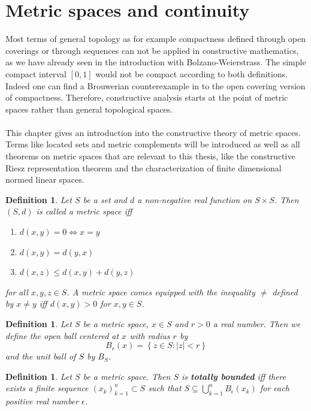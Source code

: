 \documentclass[11pt,a4paper,leqno]{report}
\newtheorem{definition}[theorem]{Definition}
\numberwithin{equation}{chapter}
\begin{document}
\section{Metric spaces and continuity}
Most terms of general topology as for example compactness defined through open coverings or through sequences can not be applied in constructive mathematics, as we have already seen in the introduction with Bolzano-Weierstrass. The simple compact interval $[0,1]$ would not be compact according to both definitions. Indeed one can find a Brouwerian counterexample in \cite{VAR} to the open covering version of compactness. Therefore, constructive analysis starts at the point of metric spaces rather than general topological spaces. \\
\\
This chapter gives an introduction into the constructive theory of metric spaces. Terms like located sets and metric complements will be introduced as well as all theorems on metric spaces that are relevant to this thesis, like the constructive Riesz representation theorem and the characterization of finite dimensional normed linear spaces.
\begin{definition} Let $S$ be a set and $d$ a non-negative real function on $S\times S$. Then $(S,d)$ is called a metric space iff
\begin{enumerate}
\item{$d(x,y)=0\Leftrightarrow x=y$}
\item{$d(x,y)=d(y,x)$}
\item{$d(x,z)\leq d(x,y)+d(y,z)$}
\end{enumerate}
for all $x,y,z\in S$. A metric space comes equipped with the inequality $\neq$ defined by $x\neq y$ iff $d(x,y)>0$ for $x,y\in S$.
\end{definition}
\begin{definition} Let $S$ be a metric space, $x\in S$ and $r>0$ a real number. Then we define the open ball centered at $x$ with radius $r$ by 
\begin{equation} B_r(x)=\left\{z\in S: |z|< r\right\}\end{equation}
and the unit ball of $S$ by $B_S$.
\end{definition}
\begin{definition} Let $S$ be a metric space. Then $S$ is \textbf{totally bounded} iff there exists a finite sequence $(x_k)_{k=1}^n\subset S$ such that $S\subseteq\bigcup_{k=1}^n B_\epsilon(x_k)$ for each positive real number $\epsilon$.
\end{definition}
\end{document}
